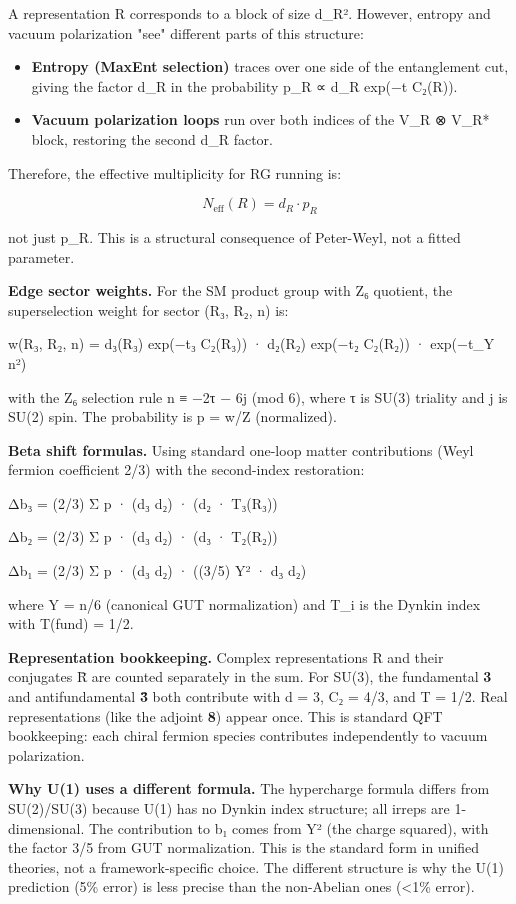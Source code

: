 A representation R corresponds to a block of size d\_R². However, entropy and vacuum polarization "see" different parts of this structure:

\begin{itemize}
\item
  \textbf{Entropy (MaxEnt selection)} traces over one side of the entanglement cut, giving the factor d\_R in the probability p\_R ∝ d\_R exp(−t C₂(R)).
\item
  \textbf{Vacuum polarization loops} run over both indices of the V\_R ⊗ V\_R* block, restoring the second d\_R factor.
\end{itemize}

Therefore, the effective multiplicity for RG running is:

\[
N_{\text{eff}}(R) = d_R \cdot p_R
\]

not just p\_R. This is a structural consequence of Peter-Weyl, not a fitted parameter.

\textbf{Edge sector weights.} For the SM product group with Z₆ quotient, the superselection weight for sector (R₃, R₂, n) is:

w(R₃, R₂, n) = d₃(R₃) exp(−t₃ C₂(R₃)) · d₂(R₂) exp(−t₂ C₂(R₂)) · exp(−t\_Y n²)

with the Z₆ selection rule n ≡ −2τ − 6j (mod 6), where τ is SU(3) triality and j is SU(2) spin. The probability is p = w/Z (normalized).

\textbf{Beta shift formulas.} Using standard one-loop matter contributions (Weyl fermion coefficient 2/3) with the second-index restoration:

Δb₃ = (2/3) Σ p · (d₃ d₂) · (d₂ · T₃(R₃))

Δb₂ = (2/3) Σ p · (d₃ d₂) · (d₃ · T₂(R₂))

Δb₁ = (2/3) Σ p · (d₃ d₂) · ((3/5) Y² · d₃ d₂)

where Y = n/6 (canonical GUT normalization) and T\_i is the Dynkin index with T(fund) = 1/2.

\textbf{Representation bookkeeping.} Complex representations R and their conjugates \={R} are counted separately in the sum. For SU(3), the fundamental \textbf{3} and antifundamental \textbf{\={3}} both contribute with d = 3, C₂ = 4/3, and T = 1/2. Real representations (like the adjoint \textbf{8}) appear once. This is standard QFT bookkeeping: each chiral fermion species contributes independently to vacuum polarization.

\textbf{Why U(1) uses a different formula.} The hypercharge formula differs from SU(2)/SU(3) because U(1) has no Dynkin index structure; all irreps are 1-dimensional. The contribution to b₁ comes from Y² (the charge squared), with the factor 3/5 from GUT normalization. This is the standard form in unified theories, not a framework-specific choice. The different structure is why the U(1) prediction (5\% error) is less precise than the non-Abelian ones (\textless1\% error).

